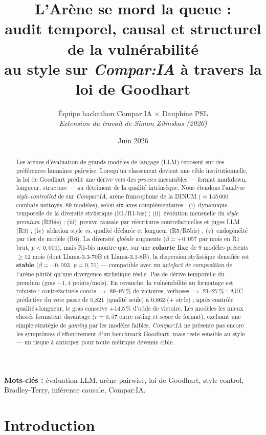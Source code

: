 \documentclass[11pt,a4paper]{article}
\title{%
  \textbf{L'Arène se mord la queue :}\\
  audit temporel, causal et structurel de la vulnérabilité\\
  au style sur \emph{Compar:IA} à travers la loi de Goodhart
}
\author{%
  Équipe hackathon Compar:IA $\times$ Dauphine PSL\\
  \textit{Extension du travail de Simon Zilinskas (2026)}
}
\date{Juin 2026}
\begin{document}
\maketitle

\begin{abstract}
Les arènes d'évaluation de grands modèles de langage (LLM) reposent sur des préférences
humaines pairwise. Lorsqu'un classement devient une cible institutionnelle, la loi de
Goodhart prédit une dérive vers des \emph{proxies} mesurables --- format markdown,
longueur, structure --- au détriment de la qualité intrinsèque.
Nous étendons l'analyse \emph{style-controlled} de \citet{zilinskas2026formatting} sur
\emph{Compar:IA}, arène francophone de la DINUM ($\approx$145\,000 combats nettoyés,
89 modèles), selon six axes complémentaires : (i)~dynamique temporelle de la diversité
stylistique (R1/R1-bis) ; (ii)~évolution mensuelle du \emph{style premium} (R2bis) ;
(iii)~preuve causale par réécritures contrefactuelles et juges LLM (R3) ;
(iv)~ablation style \emph{vs.} qualité déclarée et longueur (R5/R5bis) ;
(v)~endogénéité par tier de modèle (R6).
La diversité \emph{globale} augmente ($\beta = +0{,}057$ par mois en R1 brut,
$p < 0{,}001$), mais R1-bis montre que, sur une \textbf{cohorte fixe} de 9 modèles
présents $\geq 12$ mois (dont Llama-3.3-70B et Llama-3.1-8B), la dispersion
stylistique densifiée est \textbf{stable} ($\beta = -0{,}003$, $p = 0{,}71$) ---
compatible avec un \emph{artefact de composition} de l'arène plutôt qu'une
divergence stylistique réelle. Pas de dérive temporelle du premium (gras
$-1{,}4$ points/mois).
En revanche, la vulnérabilité au formatage est robuste : contrefactuels concis
$\rightarrow$ 89--97\,\% de victoires, verboses $\rightarrow$ 21--27\,\% ;
AUC prédictive du vote passe de 0{,}821 (qualité seule) à 0{,}862 (+ style) ;
après contrôle qualité+longueur, le gras conserve +14{,}5\,\% d'odds de victoire.
Les modèles les mieux classés formatent davantage ($r = 0{,}57$ entre rating et score
de format), excluant une simple stratégie de \emph{gaming} par les modèles faibles.
\emph{Compar:IA} ne présente pas encore les symptômes d'effondrement d'un benchmark
Goodhart, mais reste sensible au style --- un risque à anticiper pour toute métrique
devenue cible.
\end{abstract}

\noindent\textbf{Mots-clés :} évaluation LLM, arène pairwise, loi de Goodhart, style
control, Bradley-Terry, inférence causale, Compar:IA.

\section{Introduction}
\label{sec:intro}
\end{document}
